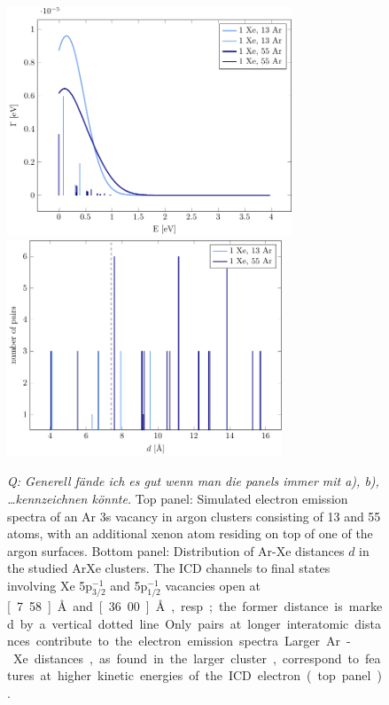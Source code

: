 \begin{figure}[ht]
 \centering
 \includegraphics[width=8.5cm]{pics/surf.pdf}\\
 \includegraphics[width=8.2cm]{pics/R_comp.pdf}
 \caption{
 {\it Q: Generell f\"ande ich es gut wenn man die panels immer mit a), b), \dots kennzeichnen k\"onnte.}
 Top panel: Simulated electron emission spectra of an Ar 3s vacancy in 
          argon clusters
          consisting of 13 and 55 atoms, with an additional xenon atom residing
          on top of one of the argon surfaces.
          Bottom panel: Distribution of Ar-Xe distances $d$ in the studied ArXe
          clusters. The ICD channels to final states involving Xe 5p$_{3/2}^{-1}$ and 
          5p$_{1/2}^{-1}$ vacancies open at \unit[7.58]{\AA} and
          \unit[36.00]{\AA}, resp.; the former distance is marked by a vertical dotted line. 
          Only pairs at longer interatomic
          distances contribute to the electron emission spectra.
          Larger Ar-Xe distances, as found in the larger cluster,
          correspond to features at higher kinetic energies of
          the ICD electron (top panel).}
 \label{figure:surf}
\end{figure}

